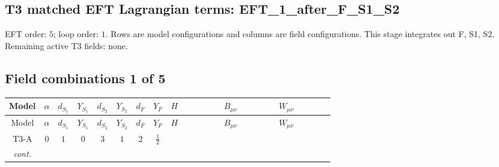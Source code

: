 \documentclass[8pt]{article}
\begin{document}
\begin{landscape}
\section*{T3 matched EFT Lagrangian terms: EFT\_1\_after\_F\_S1\_S2}
EFT order: $5$; loop order: $1$. 
Rows are model configurations and columns are field configurations. This stage integrates out F, S1, S2. Remaining active T3 fields: none.
\tiny
\subsection*{Field combinations 1 of 5}
\begin{longtable}{@{}cccccccc >{\raggedright\arraybackslash}p{0.21\linewidth} >{\raggedright\arraybackslash}p{0.21\linewidth} >{\raggedright\arraybackslash}p{0.21\linewidth}@{}}
\toprule
Model & $\alpha$ & $d_{S_1}$ & $Y_{S_1}$ & $d_{S_2}$ & $Y_{S_2}$ & $d_F$ & $Y_F$ & $H$ & $B_{\mu\nu}$ & $W_{\mu\nu}$ \\
\midrule
\endfirsthead
\toprule
Model & $\alpha$ & $d_{S_1}$ & $Y_{S_1}$ & $d_{S_2}$ & $Y_{S_2}$ & $d_F$ & $Y_F$ & $H$ & $B_{\mu\nu}$ & $W_{\mu\nu}$ \\
\midrule
\endhead
T3-A & $0$ & $1$ & $0$ & $3$ & $1$ & $2$ & $\frac{1}{2}$ & \scriptsize\adjustbox{max width=\linewidth}{$\begin{gathered} +\frac{\hbar  H_{a_3} H_{a_4} H_{a_1}{}^{\dagger } H_{a_2}{}^{\dagger } \mathcal{I}_{H1,a_1,a_3}{}^1 \mathcal{I}_{H1,a_2,a_4}{}^1 \left(\lambda_{H1}^{(1)}\right){}^2}{2 \epsilon } \\ +\frac{3 \hbar  H_{a_1} H_{a_2} H_{a_1}{}^{\dagger } H_{a_2}{}^{\dagger } \left(\lambda_{H2}^{(2)}\right){}^2}{2 \epsilon } \\ +\text{CH21} H_{a_1} H_{a_1}{}^{\dagger }\end{gathered}$} & \scriptsize\adjustbox{max width=\linewidth}{$\begin{gathered} -\frac{3 \hbar  B_{\mu _1\mu _2}^2}{4 \epsilon }\end{gathered}$} & \scriptsize\adjustbox{max width=\linewidth}{$\begin{gathered} -\frac{2 \hbar  \left(W_{\mu _1\mu _2}^{A_1}\right){}^2}{3 \epsilon }\end{gathered}$} \\
\textit{cont.} &  &  &  &  &  &  &  & \scriptsize\adjustbox{max width=\linewidth}{$\begin{gathered} -H_{a_1} \mu ^2 H_{a_1}{}^{\dagger } \\ +\frac{2 \hbar  \overline{\lambda_{T3}} H_{a_1} H_{a_2} \lambda_{T3} H_{a_1}{}^{\dagger } H_{a_2}{}^{\dagger }}{\sqrt{3} \epsilon } \\ +\hbar  C_{\text{H2}} H_{a_2} H_{a_1}{}^{\dagger } \mathcal{I}_{H1,a_1,a_2}{}^1\end{gathered}$} &  &  \\

\end{longtable}
\end{landscape}
\end{document}
